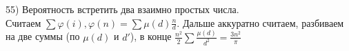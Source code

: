55) Вероятность встретить два взаимно простых числа.\\
Считаем $\sum \varphi(i), \varphi(n)=\sum \mu(d)\frac{n}{d}$. Дальше аккуратно считаем, разбиваем на две суммы (по $\mu(d)$ и $d'$), в конце $\frac{n^2}{2}\sum\frac{\mu(d)}{d^2}=\frac{3n^2}{\pi}$
